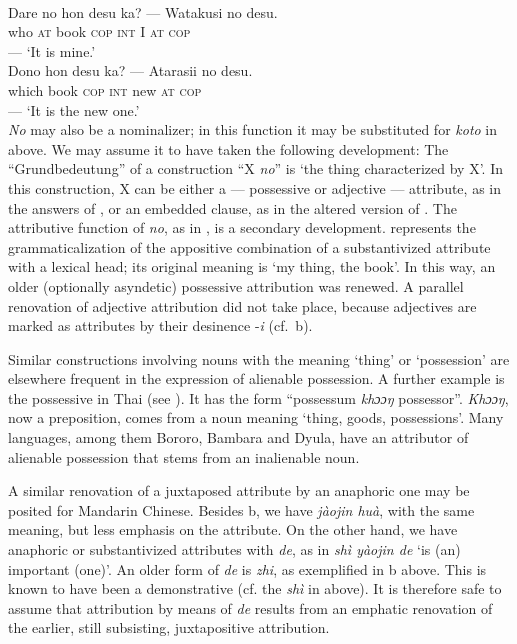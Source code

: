 \ea\label{ex:E40}
\langinfo{\LangJap}{}{} \\
 \ea
 \gll Dare  no  hon  desu  ka?  ---  Watakusi  no  desu.\\
  who  \textsc{at}  book  \textsc{cop}  \textsc{int}  {}  I  \textsc{at}  \textsc{cop}\\
 ---  {‘It is mine.’}\\
\ex
\gll  Dono  hon  desu  ka?  ---  Atarasii  no  desu.\\
 which  book \textsc{cop}  \textsc{int}  {} new  \textsc{at}  \textsc{cop}\\
 --- {‘It is the new one.’}\\
\z
\z 
\noindent\label{page74b}\textit{No} may also be a nominalizer; in this function it may be substituted for \textit{koto} in  above. We may assume it to have taken the following development: The ``Grundbedeutung'' of a construction ``X \textit{no}'' is ‘the thing characterized by X’. In this construction, X can be either a — possessive or adjective — attribute, as in the answers of , or an embedded clause, as in the altered version of . The attributive function of \textit{no}, as in , is a secondary development.  represents the grammaticalization of the appositive combination of a substantivized attribute with a lexical head; its original meaning is ‘my thing, the book’. In this way, an older (optionally asyndetic) possessive attribution was renewed. A parallel renovation of adjective attribution did not take place, because adjectives are marked as attributes by their desinence -\textit{i} (cf.~b).

\label{page75}Similar constructions involving nouns with the meaning ‘thing’ or ‘possession’ are elsewhere frequent in the expression of alienable possession. A further example is the possessive \np in Thai (see \citealt[389]{MallinsonEtAl1981}). It has the form ``possessum \textit{khɔɔŋ} possessor''. \textit{Khɔɔŋ}, now a preposition, comes from a noun meaning ‘thing, goods, possessions’. Many languages, among them Bororo, Bambara and Dyula, have an attributor of alienable possession that stems from an inalienable noun.

A similar renovation of a juxtaposed attribute by an anaphoric one may be posited for Mandarin Chinese. Besides b, we have \textit{jàojin huà}, with the same meaning, but less emphasis on the attribute. On the other hand, we have anaphoric or substantivized attributes with \textit{de}, as in \textit{shì yàojin de} ‘is (an) important (one)’. An older form of \textit{de} is \textit{zhi}, as exemplified in b above. This is known to have been a demonstrative (cf. the \textit{shì} in  above). It is therefore safe to assume that attribution by means of \textit{de} results from an emphatic renovation of the earlier, still subsisting, juxtapositive attribution.

